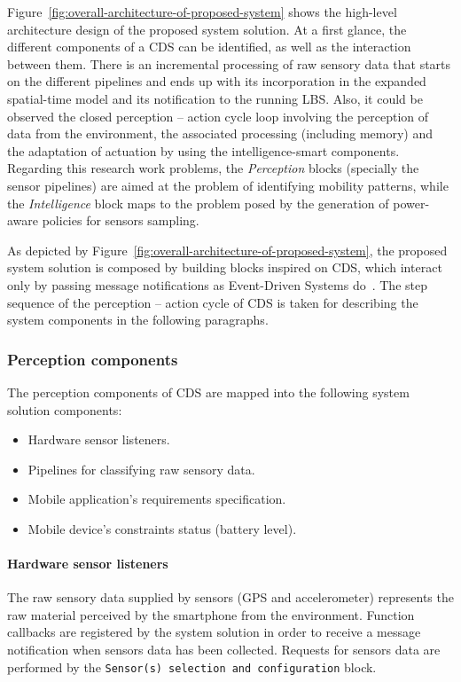 \documentclass[ENG,PhD]{cinvestav}
\begin{document}
Figure~\ref{fig:overall-architecture-of-proposed-system} shows the high-level architecture design of the proposed system solution.
At a first glance, the different components of a CDS can be identified, as well as the interaction between them.
There is an incremental processing of raw sensory data that starts on the different pipelines and ends up with its incorporation in the expanded spatial-time model and its notification to the running LBS.
Also, it could be observed the closed perception -- action cycle loop involving the perception of data from the environment, the associated processing (including memory) and the adaptation of actuation by using the intelligence-smart components.
Regarding this research work problems, the \emph{Perception} blocks (specially the sensor pipelines) are aimed at the problem of identifying mobility patterns, while the \emph{Intelligence} block maps to the problem posed by the generation of power-aware policies for sensors sampling.


As depicted by Figure~\ref{fig:overall-architecture-of-proposed-system}, the proposed system solution is composed by building blocks inspired on CDS, which interact only by passing message notifications as Event-Driven Systems do~\cite{Faison2011,Etzion2011}.
The step sequence of the perception -- action cycle of CDS is taken for describing the system components in the following paragraphs.

\subsubsection{Perception components}
The perception components of CDS are mapped into the following system solution components:
\begin{itemize}
  \item Hardware sensor listeners.
  \item Pipelines for classifying raw sensory data.
  \item Mobile application's requirements specification.
  \item Mobile device's constraints status (battery level).
\end{itemize}

\paragraph{Hardware sensor listeners}
The raw sensory data supplied by sensors (GPS and accelerometer) represents the raw material perceived by the smartphone from the environment.
Function callbacks are registered by the system solution in order to receive a message notification when sensors data has been collected.
Requests for sensors data are performed by the \texttt{Sensor(s) selection and configuration} block.
\end{document}
